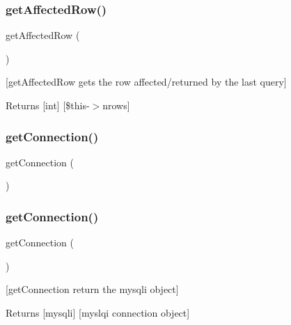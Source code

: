 \subsubsection{\texorpdfstring{get\+Affected\+Row()}{getAffectedRow()}}
{\footnotesize\ttfamily get\+Affected\+Row (\begin{DoxyParamCaption}{ }\end{DoxyParamCaption})}

\mbox{[}get\+Affected\+Row gets the row affected/returned by the last query\mbox{]} \begin{DoxyReturn}{Returns}
\mbox{[}int\mbox{]} \mbox{[}\$this-\/$>$nrows\mbox{]} 
\end{DoxyReturn}
\mbox{\label{class_my_sql_conection_ab7a0a080d0e721c656eef11cd641638b}} 
\subsubsection{\texorpdfstring{get\+Connection()}{getConnection()}\hspace{0.1cm}{\footnotesize\ttfamily [1/2]}}
{\footnotesize\ttfamily get\+Connection (\begin{DoxyParamCaption}{ }\end{DoxyParamCaption})}

\mbox{\label{class_my_sql_conection_ab7a0a080d0e721c656eef11cd641638b}} 
\subsubsection{\texorpdfstring{get\+Connection()}{getConnection()}\hspace{0.1cm}{\footnotesize\ttfamily [2/2]}}
{\footnotesize\ttfamily get\+Connection (\begin{DoxyParamCaption}{ }\end{DoxyParamCaption})}

\mbox{[}get\+Connection return the mysqli object\mbox{]} \begin{DoxyReturn}{Returns}
\mbox{[}mysqli\mbox{]} \mbox{[}myslqi connection object\mbox{]} 
\end{DoxyReturn}
\mbox{\label{class_my_sql_conection_af40dd57b52816d36d041b95cc08dba05}} 
